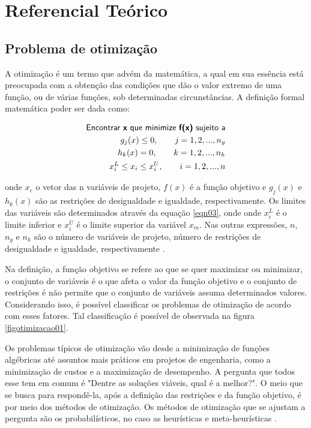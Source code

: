 
\chapter[Referencial Teórico]{Referencial Teórico}

\section{Problema de otimização}

A otimização é um termo que advém da matemática, a qual em sua essência está preocupada com a obtenção das condições que dão o valor extremo de uma função, ou de várias funções, sob determinadas circunstâncias. A definição formal matemática poder ser dada como: 

\begin{eqnarray}
\label{eqn01}
	 \textsf{Encontrar \textbf{x} que minimize \textbf{f(x)} sujeito a} \nonumber \\
     g_j(x) \leq 0, \qquad j = 1, 2, ..., n_g \\
\label{eqn02}
      h_k(x) = 0, \qquad k = 1, 2, ..., n_h \\
\label{eqn03}
      x_{i}^{L} \leq x_i \leq x_{i}^{U}, \qquad i = 1, 2, ..., n 
\end{eqnarray}

onde $x_{e}$ o vetor das n variáveis de projeto, $f(x)$ é a função objetivo e $g_{j}(x)$ e $h_{k}(x)$ são as restrições de desigualdade e igualdade, respectivamente. Os limites das variáveis são determinados através da equação \ref{eqn03}, onde onde $x_{i}^{L}$ é o limite inferior e $x_{i}^{U}$ é o limite superior da variável $x_{m}$. Nas outras expressões, $n$, $n_{g}$ e $n_{h}$ são o número de variáveis de projeto, número de restrições de desigualdade e igualdade, respectivamente \cite{gandomi2013metaheuristic}.

Na definição, a função objetivo se refere ao que se quer maximizar ou minimizar, o conjunto de variáveis é o que afeta o valor da função objetivo e o conjunto de restrições é não permite que o conjunto de variáveis assuma
determinados valores. Considerando isso, é possível classificar os problemas de otimização de acordo com esses fatores. Tal classificação é possível de observada na figura \ref{figotimizacao01}.

Os problemas típicos de otimização vão desde a minimização de funções algébricas até assuntos mais práticos em projetos de engenharia, como a minimização de custos e a maximização de desempenho. A pergunta que todos esse tem em comum é "Dentre as soluções viáveis, qual é a melhor?". O meio que se busca para respondê-la, após a definição das restrições e da função objetivo, é por meio dos métodos de otimização. Os métodos de otimização que se ajustam a pergunta são os probabilísticos, no caso as heurísticas e meta-heurísticas \cite{gandomi2013metaheuristic}.

